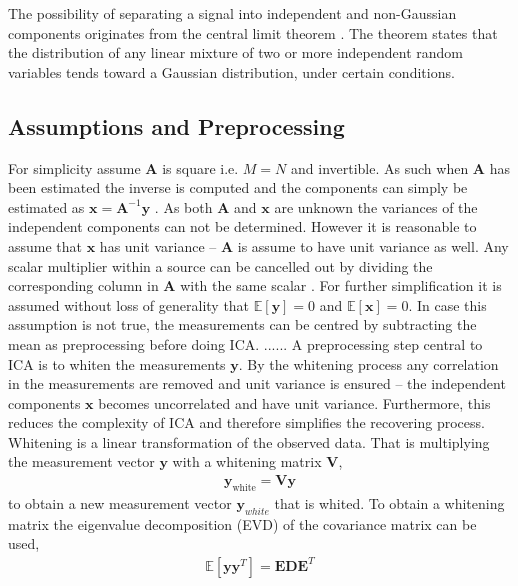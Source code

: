 The possibility of separating a signal into independent and non-Gaussian components originates from the central limit theorem \cite[p. 34]{ICA}. 
The theorem states that the distribution of any linear mixture of two or more independent random variables tends toward a Gaussian distribution, under certain conditions. 

\subsection{Assumptions and Preprocessing}
For simplicity assume $\mathbf{A}$ is square i.e. $M = N$ and invertible. 
As such when $\mathbf{A}$ has been estimated the inverse is computed and the components can simply be estimated as $\mathbf{x} = \mathbf{A}^{-1} \mathbf{y}$ \cite[p. 152-153]{ICA}.
As both $\mathbf{A}$ and $\mathbf{x}$ are unknown the variances of the independent components can not be determined. 
However it is reasonable to assume that $\mathbf{x}$ has unit variance -- $\mathbf{A}$ is assume to have unit variance as well. 
Any scalar multiplier within a source can be cancelled out by dividing the corresponding column in $\mathbf{A}$ with the same scalar \cite[p. 154]{ICA}.
For further simplification it is assumed without loss of generality that $\mathbb{E}[\mathbf{y}] = 0$ and $\mathbb{E}[\mathbf{x}] = 0$\cite[p. 154]{ICA}. 
In case this assumption is not true, the measurements can be centred by subtracting the mean as preprocessing before doing ICA.
......
A preprocessing step central to ICA is to whiten the measurements $\mathbf{y}$. 
By the whitening process any correlation in the measurements are removed and unit variance is ensured -- the independent components $\mathbf{x}$ becomes uncorrelated and have unit variance. 
Furthermore, this reduces the complexity of ICA and therefore simplifies the recovering process.
Whitening is a linear transformation of the observed data. 
That is multiplying the measurement vector $\textbf{y}$ with a whitening matrix $\textbf{V}$,
\begin{align*}
\textbf{y}_{\text{white}} = \textbf{V}\textbf{y}
\end{align*} 
to obtain a new measurement vector $\textbf{y}_{white}$ that is whited. 
To obtain a whitening matrix the eigenvalue decomposition (EVD) of the covariance matrix can be used,
\begin{align*}
\mathbb{E}[\mathbf{yy}^T] = \mathbf{EDE}^T
\end{align*}
